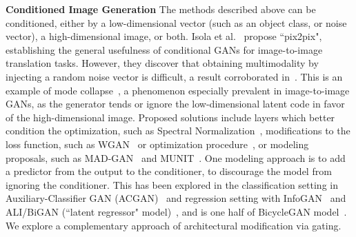 \vspace{2mm} \noindent \textbf{Conditioned Image Generation} The methods described above can be conditioned, either by a low-dimensional vector (such as an object class, or noise vector), a high-dimensional image, or both. Isola et al.~\cite{isola2016image2image} propose ``pix2pix", establishing the general usefulness of conditional GANs for image-to-image translation tasks. However, they discover that obtaining multimodality by injecting a random noise vector is difficult, a result corroborated in~\cite{mathieu2015deep,pathak2016context,zhu2017toward}.
This is an example of mode collapse~\cite{goodfellow2016nips}, a phenomenon especially prevalent in image-to-image GANs, as the generator tends or ignore the low-dimensional latent code in favor of the high-dimensional image.
Proposed solutions include layers which better condition the optimization, such as Spectral Normalization~\cite{zhang2018self,miyato2018spectral}, modifications to the loss function, such as WGAN~\cite{arjovsky2017wasserstein,gulrajani2017improved} or optimization procedure~\cite{heusel2017gans}, or modeling proposals, such as MAD-GAN~\cite{ghosh2017multi} and MUNIT~\cite{huang2018multimodal}. 
One modeling approach is to add a predictor from the output to the conditioner, to discourage the model from ignoring the conditioner. This has been explored in the classification setting in Auxiliary-Classifier GAN (ACGAN)~\cite{odena2016conditional} and regression setting with InfoGAN~\cite{chen2016infogan} and ALI/BiGAN (``latent regressor" model)~\cite{dumoulin2016adversarially,donahue2016adversarial}, and is one half of BicycleGAN model~\cite{zhu2017toward}. We explore a complementary approach of architectural modification via gating.

